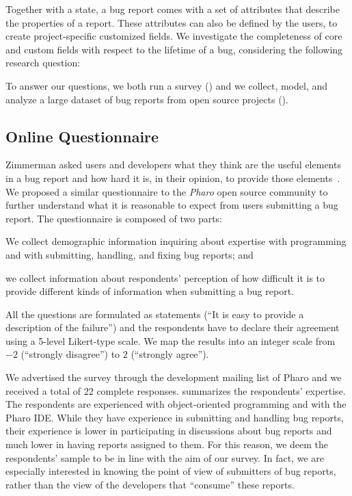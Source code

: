 
Together with a state, a bug report comes with a set of attributes that describe the properties of a report. These attributes can also be defined by the users, to create project-specific customized fields. We investigate the completeness of core and custom fields with respect to the lifetime of a bug, considering the following research question:


To answer our questions, we both run a survey () and we collect, model, and analyze a large dataset of bug reports from open source projects ().

\subsection{Online Questionnaire} \label{sec:survey}

Zimmerman \etal asked users and developers what they think are the useful elements in a bug report and how hard it is, in their opinion, to provide those elements~\cite{Zimm2010}. We proposed a similar questionnaire to the \emph{Pharo} open source community to further understand what it is reasonable to expect from users submitting a bug report. The questionnaire is composed of two parts: \begin{inparaenum}[(1)]
\item We collect demographic information inquiring about expertise with programming and with submitting, handling, and fixing bug reports; and
\item we collect information about respondents' perception of how difficult it is to provide different kinds of information when submitting a bug report.
\end{inparaenum}
All the questions are formulated as statements (\eg ``It is easy to provide a description of the failure'') and the respondents have to declare their agreement using a 5-level Likert-type scale. We map the results into an integer scale from $-2$ (\ie ``strongly disagree'') to $2$ (\ie ``strongly agree'').

We advertised the survey through the development mailing list of Pharo and we received a total of 22 complete responses.  summarizes the respondents' expertise. The respondents are experienced with object-oriented programming and with the Pharo IDE. While they have experience in submitting and handling bug reports, their experience is lower in participating in discussions about bug reports and much lower in having reports assigned to them. For this reason, we deem the respondents' sample to be in line with the aim of our survey. In fact, we are especially interested in knowing the point of view of submitters of bug reports, rather than the view of the developers that ``consume'' these reports.

